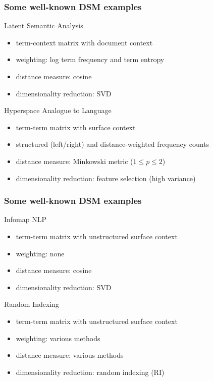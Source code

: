 \documentclass[t]{beamer} %
\begin{document}
\begin{frame}
  \frametitle{Some well-known DSM examples}

  \ungap
  \begin{block} {Latent Semantic Analysis \citep{Landauer:Dumais:97}}
  \begin{itemize}
  \item term-context matrix with document context
  \item weighting: log term frequency and term entropy
  \item distance measure: cosine
  \item dimensionality reduction: SVD
  \end{itemize}
  \end{block}
 
 \begin{block} {Hyperspace Analogue to Language \citep{Lund:Burgess:96}}
  \begin{itemize}
  \item term-term matrix with surface context
  \item structured (left/right) and distance-weighted frequency counts
  \item distance measure: Minkowski metric ($1\leq p \leq 2$)
  \item dimensionality reduction: feature selection (high variance)
  \end{itemize}
  \end{block}
\end{frame}

\begin{frame}
  \frametitle{Some well-known DSM examples}

  \ungap
  \begin{block} {Infomap NLP \citep{Widdows:04}}
  \begin{itemize}
  \item term-term matrix with unstructured surface context
  \item weighting: none
  \item distance measure: cosine
  \item dimensionality reduction: SVD
  \end{itemize}
  \end{block}
 
  \begin{block} {Random Indexing \citep{Karlgren:Sahlgren:01}}
    \begin{itemize}
    \item term-term matrix with unstructured surface context
    \item weighting: various methods 
    \item distance measure: various methods
    \item dimensionality reduction: random indexing (RI)
    \end{itemize}
  \end{block}
\end{frame}
\end{document}
